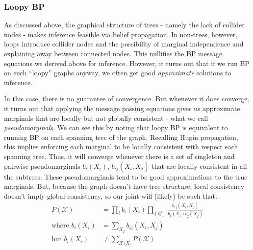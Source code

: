 \documentclass[a4paper]{article}
\begin{document}
\subsubsection{Loopy BP} \label{loopy bp}
As discussed above, the graphical structure of trees - namely the lack of collider nodes - makes inference feasible via belief propagation. In non-trees, however, loops introduce collider nodes and the possibility of marginal independence and explaining away between connected nodes. This nullifies the BP message equations we derived above for inference. However, it turns out that if we run BP on such ``loopy'' graphs anyway, we often get good \emph{approximate} solutions to inference. 

In this case, there is no guarantee of convergence. But whenever it does converge, it turns out that applying the message passing equations gives us approximate marginals that are locally but not globally consistent - what we call \emph{pseudomarginals}. We can see this by noting that loopy BP is equivalent to running BP on each spanning tree of the graph. Recalling Hugin propagation, this implies enforcing each marginal to be locally consistent with respect each spanning tree. Thus, it will converge whenever there is a set of singleton and pairwise pseudomarginals $b_i(X_i)$, $b_{ij}(X_i,X_j)$ that are locally consistent in all the subtrees. These pseudomarginals tend to be good approximations to the true marginals. But, because the graph doesn't have tree structure, local consistency doesn't imply global consistency, so our joint will (likely) be such that:
\begin{align*}
P(\mathcal{X}) &= \prod_i b_i(X_i) \prod_{(ij)} \frac{b_{ij}(X_i,X_j)}{b_i(X_i)b_j(X_j)} \\
\text{where } b_i(X_i) &= \sum_{X_j} b_{ij}(X_i,X_j) \\
\text{but } b_i(X_i) &\neq \sum_{\mathcal{X}\setminus X_i} P(\mathcal{X})
\end{align*}
\end{document}
